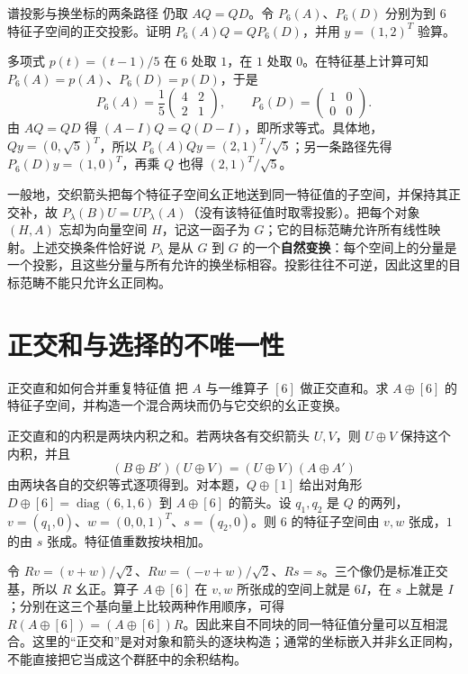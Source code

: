 \begin{example}{谱投影与换坐标的两条路径}
仍取 $AQ=QD$。令 $P_6(A)$、$P_6(D)$ 分别为到 $6$ 特征子空间的正交投影。证明 $P_6(A)Q=QP_6(D)$，并用 $y=(1,2)^T$ 验算。
\end{example}
\begin{solution}
多项式 $p(t)=(t-1)/5$ 在 $6$ 处取 $1$，在 $1$ 处取 $0$。在特征基上计算可知 $P_6(A)=p(A)$、$P_6(D)=p(D)$，于是
\[
 P_6(A)=\frac15\begin{pmatrix}4&2\\2&1\end{pmatrix},\qquad
 P_6(D)=\begin{pmatrix}1&0\\0&0\end{pmatrix}.
\]
由 $AQ=QD$ 得 $(A-I)Q=Q(D-I)$，即所求等式。具体地，$Qy=(0,\sqrt5)^T$，所以 $P_6(A)Qy=(2,1)^T/\sqrt5$；另一条路径先得 $P_6(D)y=(1,0)^T$，再乘 $Q$ 也得 $(2,1)^T/\sqrt5$。

一般地，交织箭头把每个特征子空间幺正地送到同一特征值的子空间，并保持其正交补，故 $P_\lambda(B)U=UP_\lambda(A)$（没有该特征值时取零投影）。把每个对象 $(H,A)$ 忘却为向量空间 $H$，记这一函子为 $G$；它的目标范畴允许所有线性映射。上述交换条件恰好说 $P_\lambda$ 是从 $G$ 到 $G$ 的一个\textbf{自然变换}：每个空间上的分量是一个投影，且这些分量与所有允许的换坐标相容。投影往往不可逆，因此这里的目标范畴不能只允许幺正同构。
\end{solution}

\section{正交和与选择的不唯一性}

\begin{example}{正交直和如何合并重复特征值}
把 $A$ 与一维算子 $[6]$ 做正交直和。求 $A\oplus[6]$ 的特征子空间，并构造一个混合两块而仍与它交织的幺正变换。
\end{example}
\begin{solution}
正交直和的内积是两块内积之和。若两块各有交织箭头 $U,V$，则 $U\oplus V$ 保持这个内积，并且
\[
 (B\oplus B')(U\oplus V)=(U\oplus V)(A\oplus A')
\]
由两块各自的交织等式逐项得到。对本题，$Q\oplus[1]$ 给出对角形 $D\oplus[6]=\operatorname{diag}(6,1,6)$ 到 $A\oplus[6]$ 的箭头。设 $q_1,q_2$ 是 $Q$ 的两列，$v=(q_1,0)$、$w=(0,0,1)^T$、$s=(q_2,0)$。则 $6$ 的特征子空间由 $v,w$ 张成，$1$ 的由 $s$ 张成。特征值重数按块相加。

令 $Rv=(v+w)/\sqrt2$、$Rw=(-v+w)/\sqrt2$、$Rs=s$。三个像仍是标准正交基，所以 $R$ 幺正。算子 $A\oplus[6]$ 在 $v,w$ 所张成的空间上就是 $6I$，在 $s$ 上就是 $I$；分别在这三个基向量上比较两种作用顺序，可得 $R(A\oplus[6])=(A\oplus[6])R$。因此来自不同块的同一特征值分量可以互相混合。这里的“正交和”是对对象和箭头的逐块构造；通常的坐标嵌入并非幺正同构，不能直接把它当成这个群胚中的余积结构。
\end{solution}

